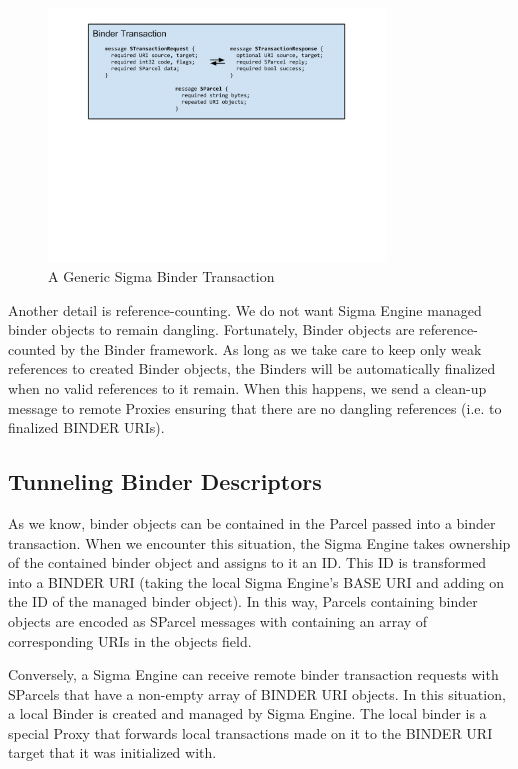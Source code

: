 \documentclass[prodmode]{acmlarge}
\begin{document}
\begin{figure}[h!]
\centering
\includegraphics[width=0.8\textwidth]{drawings/WireBinderTransaction.pdf}
\caption{A Generic Sigma Binder Transaction}
\label{fig:GenericSigmaBinderTransaction}
\end{figure}

Another detail is reference-counting. We do not want Sigma Engine managed binder objects to remain dangling. Fortunately, Binder objects are reference-counted by the Binder framework. As long as we take care to keep only weak references to created Binder objects, the Binders will be automatically finalized when no valid references to it remain. When this happens, we send a clean-up message to remote Proxies ensuring that there are no dangling references (i.e. to finalized BINDER URIs).

\subsection{Tunneling Binder Descriptors}
As we know, binder objects can be contained in the Parcel passed into a binder transaction. When we encounter this situation, the Sigma Engine takes ownership of the contained binder object and assigns to it an ID. This ID is transformed into a BINDER URI (taking the local Sigma Engine's BASE URI and adding on the ID of the managed binder object). In this way, Parcels containing binder objects are encoded as SParcel messages with containing an array of corresponding URIs in the objects field.

Conversely, a Sigma Engine can receive remote binder transaction requests with SParcels that have a non-empty array of BINDER URI objects. In this situation, a local Binder is created and managed by Sigma Engine. The local binder is a special Proxy that forwards local transactions made on it to the BINDER URI target that it was initialized with.
\end{document}
